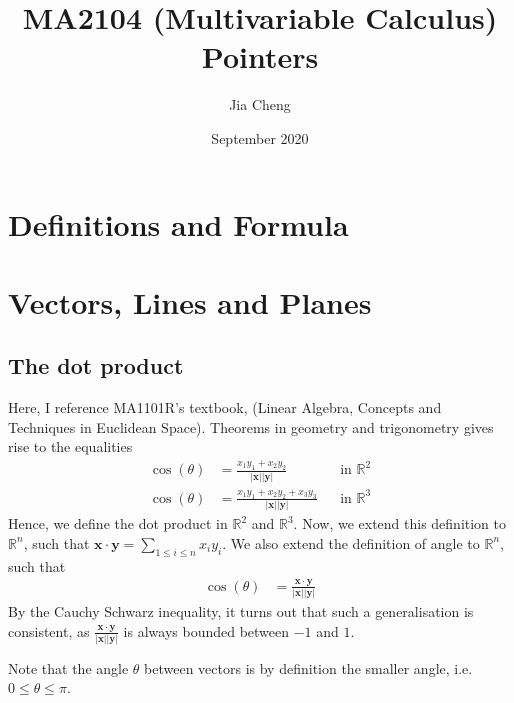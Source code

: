 \documentclass{article}
\title{MA2104 (Multivariable Calculus) Pointers}
\author{Jia Cheng}
\date{September 2020}
\begin{document}
\maketitle

\section{Definitions and Formula}


\section{Vectors, Lines and Planes}
\subsection{The dot product}
Here, I reference MA1101R's textbook, (Linear Algebra, Concepts and Techniques in Euclidean Space).
Theorems in geometry and trigonometry gives rise to the equalities
\begin{align*}
	\cos(\theta) &= \frac{x_1y_1+x_2y_2}{|\mathbf{x}||\mathbf{y}|} &&\text{in } \mathbb{R}^2\\
	\cos(\theta) &= \frac{x_1y_1+x_2y_2+x_3y_3}{|\mathbf{x}||\mathbf{y}|} &&\text{in } \mathbb{R}^3
\end{align*} 
Hence, we define the dot product in $\mathbb{R}^2$ and $\mathbb{R}^3$. Now, we extend this definition to $\mathbb{R}^n$, such that $\mathbf{x}\cdot \mathbf{y} = \sum_{1\leq i\leq n}x_iy_i$. We also extend the definition of angle to $\mathbb{R}^n$, such that 
\begin{align*}
	\cos(\theta) &= \frac{\mathbf{x}\cdot \mathbf{y}}{|\mathbf{x}||\mathbf{y}|}
\end{align*}
By the Cauchy Schwarz inequality, it turns out that such a generalisation is consistent, as $\frac{\mathbf{x}\cdot \mathbf{y}}{|\mathbf{x}||\mathbf{y}|}$ is always bounded between $-1$ and $1$.

Note that the angle $\theta$ between vectors is by definition the smaller angle, i.e. $0\leq \theta \leq \pi$.
\end{document}

